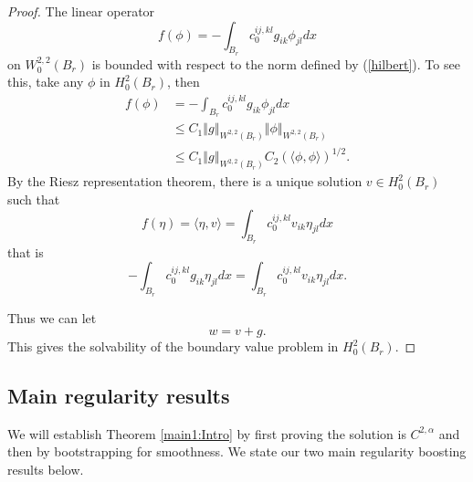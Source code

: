 \documentclass[12pt,leqno]{amsart}%
\newtheorem{theorem}{Theorem}[section]
\theoremstyle{plain}
\numberwithin{equation}{section}
\theoremstyle{definition}
\begin{document}
\begin{proof}
The linear operator
\[
f(\phi)=-\int_{B_{r}}c_{0}^{ij,kl}g_{ik}\phi_{jl}dx
\]
on $W^{2,2}_{0}(B_{r})$ is bounded with respect to the norm defined by
(\ref{hilbert}). To see this, take any $\phi$ in $H_{0}^{2}(B_{r})$, then
\begin{align*}
f(\phi)  &  =-\int_{B_{r}}c_{0}^{ij,kl}g_{ik}\phi_{jl}dx\\
&\leq C_{1}\left\Vert
g\right\Vert _{W^{2,2}(B_{r})}\left\Vert \phi\right\Vert _{W^{2,2}(B_{r})}\\
&  \leq C_{1}\left\Vert g\right\Vert _{W^{2,2}(B_{r})}C_{2}\left(  \langle
\phi,\phi\rangle\right)  ^{1/2}.
\end{align*}
By the Riesz representation theorem, there is a unique solution $v\in
H_{0}^{2}(B_{r})$ such that
\[
f(\eta)=\langle\eta,v\rangle=\int_{B_r} c_{0}^{ij,kl}v_{ik}\eta_{jl}dx
\]
that is
\[
-\int_{B_{r}}c_{0}^{ij,kl}g_{ik}\eta_{jl}dx=\int_{B_r} c_{0}^{ij,kl}v_{ik}\eta
_{jl}dx.
\]

Thus we
can let
\[
w=v+g.
\]
This gives the solvability of the boundary value problem in $H^2_0(B_r)$. 
\end{proof}

\subsection{Main regularity results\label{regresults}}

We will establish Theorem \ref{main1:Intro} by first proving the solution is
$C^{2,\alpha}$ and then by bootstrapping for smoothness. We state our two main
regularity boosting results below.

\end{document}
